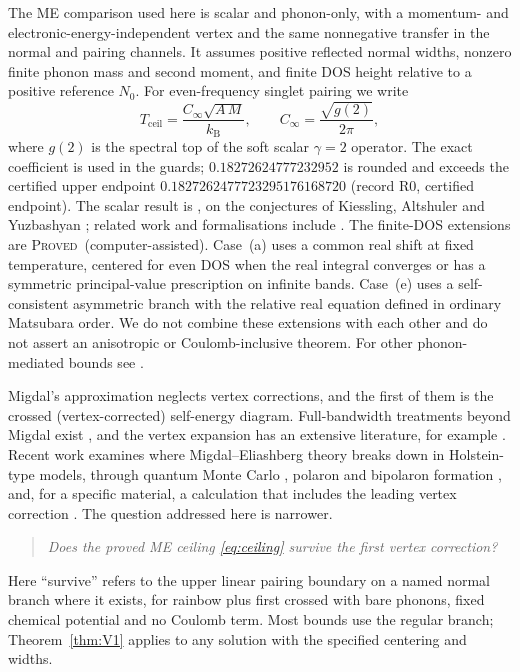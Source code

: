 \documentclass[11pt]{article}
\newcommand{\PROVED}{\upshape\mdseries\textsc{Proved}}
\newcommand{\Cinf}{C_\infty}
\newcommand{\kB}{k_{\mathrm B}}
\newcommand{\Tceil}{T_{\mathrm{ceil}}}
\theoremstyle{definition}
\theoremstyle{remark}
\begin{document}
The ME comparison used here is scalar and phonon-only, with a momentum- and electronic-energy-independent vertex and the same nonnegative transfer in the normal and pairing channels. It assumes positive reflected normal widths, nonzero finite phonon mass and second moment, and finite DOS height relative to a positive reference $N_0$. For even-frequency singlet pairing we write
\begin{equation}\label{eq:ceiling}
\Tceil=\frac{\Cinf\sqrt{A\,M}}{\kB},\qquad \Cinf=\frac{\sqrt{g(2)}}{2\pi},
\end{equation}
where $g(2)$ is the spectral top of the soft scalar $\gamma=2$ operator. The exact coefficient is used in the guards; $0.18272624777232952$ is rounded and exceeds the certified upper endpoint $0.1827262477723295176168720$ (record R0, certified endpoint). The scalar result is \cite{RensScalar}, on the conjectures of Kiessling, Altshuler and Yuzbashyan \cite{KAYGamma,KAY}; related work and formalisations include \cite{Kondratev,Siraj,KumarGSI}. The finite-DOS extensions are \PROVED\ (computer-assisted). Case~(a) uses a common real shift at fixed temperature, centered for even DOS when the real integral converges or has a symmetric principal-value prescription on infinite bands. Case~(e) uses a self-consistent asymmetric branch with the relative real equation defined in ordinary Matsubara order. We do not combine these extensions with each other and do not assert an anisotropic or Coulomb-inclusive theorem. For other phonon-mediated bounds see \cite{MoussaCohen,EsterlisBound}.

Migdal's approximation neglects vertex corrections, and the first of them is the crossed (vertex-corrected) self-energy diagram. Full-bandwidth treatments beyond Migdal exist \cite{Schrodi}, and the vertex expansion has an extensive literature, for example \cite{Miller,Paci,GrimaldiI,GrimaldiII,GrimaldiScattoni,ChubukovVertex}. Recent work examines where Migdal--Eliashberg theory breaks down in Holstein-type models, through quantum Monte Carlo \cite{EsterlisBreakdown}, polaron and bipolaron formation \cite{ChubukovVertex,ChubukovPolaron}, and, for a specific material, a calculation that includes the leading vertex correction \cite{Mishra}. The question addressed here is narrower.

\begin{quote}\emph{Does the proved ME ceiling \eqref{eq:ceiling} survive the first vertex correction?}\end{quote}

Here ``survive'' refers to the upper linear pairing boundary on a named normal branch where it exists, for rainbow plus first crossed with bare phonons, fixed chemical potential and no Coulomb term. Most bounds use the regular branch; Theorem~\ref{thm:V1} applies to any solution with the specified centering and widths.
\end{document}
